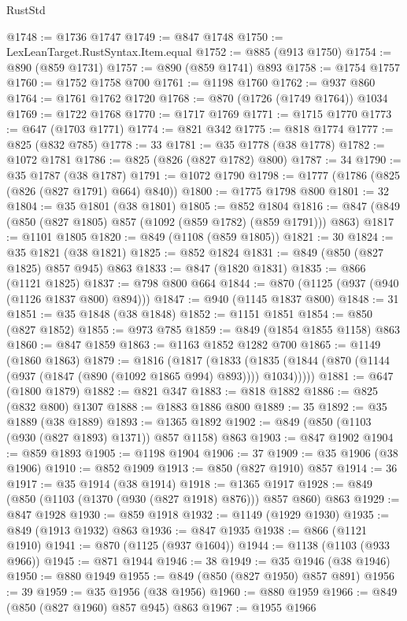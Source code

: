 \begin{lexlean}{RustStd}
\begin{coremodule}
@1748 := @1736 @1747
@1749 := @847 @1748
@1750 := LexLeanTarget.RustSyntax.Item.equal
@1752 := @885 (@913 @1750)
@1754 := @890 (@859 @1731)
@1757 := @890 (@859 @1741) @893
@1758 := @1754 @1757
@1760 := @1752 @1758 @700
@1761 := @1198 @1760
@1762 := @937 @860
@1764 := @1761 @1762 @1720
@1768 := @870 (@1726 (@1749 @1764)) @1034
@1769 := @1722 @1768
@1770 := @1717 @1769
@1771 := @1715 @1770
@1773 := @647 (@1703 @1771)
@1774 := @821 @342
@1775 := @818 @1774
@1777 := @825 (@832 @785)
@1778 := 33
@1781 := @35 @1778 (@38 @1778)
@1782 := @1072 @1781
@1786 := @825 (@826 (@827 @1782) @800)
@1787 := 34
@1790 := @35 @1787 (@38 @1787)
@1791 := @1072 @1790
@1798 := @1777 (@1786 (@825 (@826 (@827 @1791) @664) @840))
@1800 := @1775 @1798 @800
@1801 := 32
@1804 := @35 @1801 (@38 @1801)
@1805 := @852 @1804
@1816 := @847 (@849 (@850 (@827 @1805) @857 (@1092 (@859 @1782) (@859 @1791))) @863)
@1817 := @1101 @1805
@1820 := @849 (@1108 (@859 @1805))
@1821 := 30
@1824 := @35 @1821 (@38 @1821)
@1825 := @852 @1824
@1831 := @849 (@850 (@827 @1825) @857 @945) @863
@1833 := @847 (@1820 @1831)
@1835 := @866 (@1121 @1825)
@1837 := @798 @800 @664
@1844 := @870 (@1125 (@937 (@940 (@1126 @1837 @800) @894)))
@1847 := @940 (@1145 @1837 @800)
@1848 := 31
@1851 := @35 @1848 (@38 @1848)
@1852 := @1151 @1851
@1854 := @850 (@827 @1852)
@1855 := @973 @785
@1859 := @849 (@1854 @1855 @1158) @863
@1860 := @847 @1859
@1863 := @1163 @1852 @1282 @700
@1865 := @1149 (@1860 @1863)
@1879 := @1816
    (@1817
      (@1833 (@1835 (@1844 (@870 (@1144 (@937 (@1847 (@890 (@1092 @1865 @994) @893)))) @1034)))))
@1881 := @647 (@1800 @1879)
@1882 := @821 @347
@1883 := @818 @1882
@1886 := @825 (@832 @800) @1307
@1888 := @1883 @1886 @800
@1889 := 35
@1892 := @35 @1889 (@38 @1889)
@1893 := @1365 @1892
@1902 := @849 (@850 (@1103 (@930 (@827 @1893) @1371)) @857 @1158) @863
@1903 := @847 @1902
@1904 := @859 @1893
@1905 := @1198 @1904
@1906 := 37
@1909 := @35 @1906 (@38 @1906)
@1910 := @852 @1909
@1913 := @850 (@827 @1910) @857
@1914 := 36
@1917 := @35 @1914 (@38 @1914)
@1918 := @1365 @1917
@1928 := @849 (@850 (@1103 (@1370 (@930 (@827 @1918) @876))) @857 @860) @863
@1929 := @847 @1928
@1930 := @859 @1918
@1932 := @1149 (@1929 @1930)
@1935 := @849 (@1913 @1932) @863
@1936 := @847 @1935
@1938 := @866 (@1121 @1910)
@1941 := @870 (@1125 (@937 @1604))
@1944 := @1138 (@1103 (@933 @966))
@1945 := @871 @1944
@1946 := 38
@1949 := @35 @1946 (@38 @1946)
@1950 := @880 @1949
@1955 := @849 (@850 (@827 @1950) @857 @891)
@1956 := 39
@1959 := @35 @1956 (@38 @1956)
@1960 := @880 @1959
@1966 := @849 (@850 (@827 @1960) @857 @945) @863
@1967 := @1955 @1966

\end{coremodule}
\end{lexlean}
